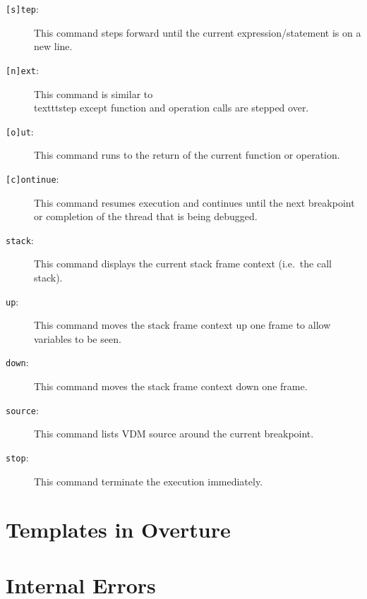 \documentclass{overturerep}
\begin{document}
{\begin{description}
\item[\texttt{[s]tep}:] This command steps forward until the
  current expression/statement is on a new line. 
\item[\texttt{[n]ext}:] This command is similar to \\texttt{step} except
 function and operation calls are stepped over.  
\item[\texttt{[o]ut}:] This command runs to the return of the current
  function or operation.  
\item[\texttt{[c]ontinue}:] This command resumes execution and continues
  until the next breakpoint or completion of the thread that is being
  debugged. 
\item[\texttt{stack}:] This command displays the current stack frame
  context (i.e.\ the call stack). 
\item[\texttt{up}:] This command moves the stack frame context up one
  frame to allow variables to be seen.  
\item[\texttt{down}:] This command moves the stack frame context down
  one frame.  
\item[\texttt{source}:] This command lists VDM source around the
  current breakpoint.  
\item[\texttt{stop}:] This command terminate the execution
  immediately.  
\end{description}

\appendix
\newpage





\newpage
\section{Templates in Overture}\label{app:templates}

\newpage
\section{Internal Errors}\label{app:internalerrors}

}
\end{document}
